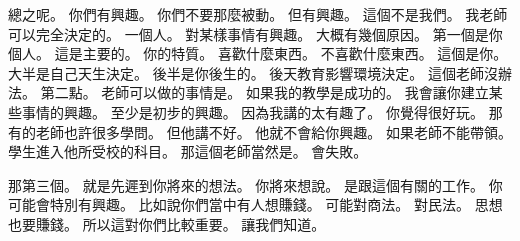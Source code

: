 \hypertarget{c01:cue:864}{}總之呢。
\hypertarget{c01:cue:865}{}你們有興趣。
\hypertarget{c01:cue:866}{}你們不要那麼被動。
\hypertarget{c01:cue:867}{}但有興趣。
\hypertarget{c01:cue:868}{}這個不是我們。
\hypertarget{c01:cue:869}{}我老師可以完全決定的。
\hypertarget{c01:cue:870}{}一個人。
\hypertarget{c01:cue:871}{}對某樣事情有興趣。
\hypertarget{c01:cue:872}{}大概有幾個原因。
\hypertarget{c01:cue:873}{}第一個是你個人。
\hypertarget{c01:cue:874}{}這是主要的。
\hypertarget{c01:cue:875}{}你的特質。
\hypertarget{c01:cue:876}{}喜歡什麼東西。
\hypertarget{c01:cue:877}{}不喜歡什麼東西。
\hypertarget{c01:cue:878}{}這個是你。
\hypertarget{c01:cue:879}{}大半是自己天生決定。
\hypertarget{c01:cue:880}{}後半是你後生的。
\hypertarget{c01:cue:881}{}後天教育影響環境決定。
\hypertarget{c01:cue:882}{}這個老師沒辦法。
\hypertarget{c01:cue:883}{}第二點。
\hypertarget{c01:cue:884}{}老師可以做的事情是。
\hypertarget{c01:cue:885}{}如果我的教學是成功的。
\hypertarget{c01:cue:886}{}我會讓你建立某些事情的興趣。
\hypertarget{c01:cue:887}{}至少是初步的興趣。
\hypertarget{c01:cue:888}{}因為我講的太有趣了。
\hypertarget{c01:cue:889}{}你覺得很好玩。
\hypertarget{c01:cue:890}{}那有的老師也許很多學問。
\hypertarget{c01:cue:891}{}但他講不好。
\hypertarget{c01:cue:892}{}他就不會給你興趣。
\hypertarget{c01:cue:893}{}如果老師不能帶領。
\hypertarget{c01:cue:894}{}學生進入他所受校的科目。
\hypertarget{c01:cue:895}{}那這個老師當然是。
\hypertarget{c01:cue:896}{}會失敗。

\hypertarget{c01:cue:897}{}那第三個。
\hypertarget{c01:cue:898}{}就是先遲到你將來的想法。
\hypertarget{c01:cue:899}{}你將來想說。
\hypertarget{c01:cue:900}{}是跟這個有關的工作。
\hypertarget{c01:cue:901}{}你可能會特別有興趣。
\hypertarget{c01:cue:902}{}比如說你們當中有人想賺錢。
\hypertarget{c01:cue:903}{}可能對商法。
\hypertarget{c01:cue:904}{}對民法。
\hypertarget{c01:cue:905}{}思想也要賺錢。
\hypertarget{c01:cue:906}{}所以這對你們比較重要。
\hypertarget{c01:cue:907}{}讓我們知道。

